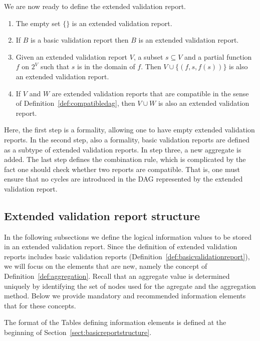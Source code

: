 We are now ready to define the extended validation report.
%
\begin{definition}\leavevmode
\label{def:extvalrep}
\begin{enumerate}
\item The empty set $\{\}$ is an extended validation report.
\item If $B$ is a basic validation report then $B$ is an extended validation report.
\item Given an extended validation report $V$, a subset $s\subseteq V$ and a
partial function $f$ on $2^V$ such that $s$ is in the domain of
$f$.  Then  $V\cup \{(f,s,f(s))\}$ is also an extended validation report. 
\item If $V$ and $W$ are extended validation reports that are compatible
in the sense of Definition~\ref{def:compatibledag}, then $V\cup W$ is
also an extended validation report.
\end{enumerate}
\end{definition}
Here, the first step is a formality, allowing one to have empty extended
validation reports. In the second step, also a formality, basic validation
reports are defined as a subtype of extended validation reports.  In step
three, a new aggregate is added.  The last step defines the combination rule,
which is complicated by the fact one should check whether two reports are
compatible. That is, one must ensure that no cycles are introduced in the DAG
represented by the extended validation report.



\subsection{Extended validation report structure}
\label{sect:extendedreport}
In the following subsections we define the logical information values to be
stored in an extended validation report. Since the definition of extended
validation reports includes basic validation reports
(Definition~\ref{def:basicvalidationreport}), we will focus on the elements
that are new, namely the  concept of
Definition~\ref{def:aggregation}.  Recall that an aggregate value is determined
uniquely by identifying the set of nodes used for the agregate and the
aggregation method. Below we provide mandatory and recommended information
elements that for these concepts.


The format of the Tables defining information elements is defined at the
beginning of Section~\ref{sect:basicreportstructure}.


